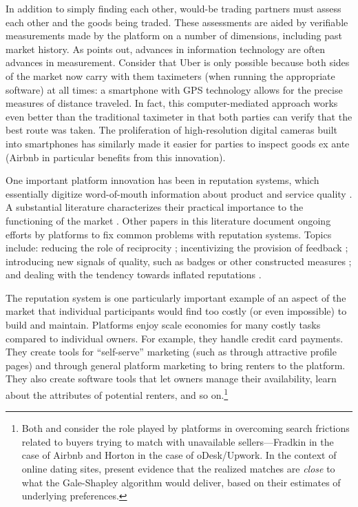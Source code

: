 \documentclass[11pt]{article}
\begin{document}
In addition to simply finding each other, would-be trading partners must assess each other and the goods being traded. 
These assessments are aided by verifiable measurements made by the platform on a number of dimensions, including past market history. 
As \cite{varian2010computer} points out, advances in information technology are often advances in measurement.  
Consider that Uber is only possible because both sides of the market now carry with them taximeters (when running the appropriate software) at all times: 
a smartphone with GPS technology allows for the precise measures of distance traveled.
In fact, this computer-mediated approach works even better than the traditional taximeter in that both parties can verify that the best route was taken. 
The proliferation of high-resolution digital cameras built into smartphones has similarly made it easier for parties to inspect goods ex ante (Airbnb in particular benefits from this innovation).  

One important platform innovation has been in reputation systems, which essentially digitize word-of-mouth information about product and service quality \cite{dellarocas2003digitization}. 
A substantial literature characterizes their practical importance to the functioning of the market \citep{cabral2010dynamics, resnick2000reputation, resnick2002trust}.
Other papers in this literature document ongoing efforts by platforms to fix common problems with reputation systems.
Topics include: reducing the role of reciprocity \citep{bolton2013engineering};
incentivizing the provision of feedback \citep{fradkin2015bias}; 
introducing new signals of quality, such as badges or other constructed measures \citep{hui2014lemon, nosko2015limits}; 
and dealing with the tendency towards inflated reputations \citep{horton2015reputation}.  

The reputation system is one particularly important example of an aspect of the market that individual participants would find too costly (or even impossible) to build and maintain. 
Platforms enjoy scale economies for many costly tasks compared to individual owners. 
For example, they handle credit card payments. 
They create tools for ``self-serve'' marketing (such as through attractive profile pages) and through general platform marketing to bring renters to the platform. 
They also create software tools that let owners manage their availability, learn about the attributes of potential renters, and so on.\footnote{
  Both \cite{horton2014misdirected} and \cite{fradkin2013search} consider the role played by platforms in overcoming search frictions related to buyers trying to match with unavailable sellers---Fradkin in the case of Airbnb and Horton in the case of oDesk/Upwork.
  In the context of online dating sites, \cite{hitsch2010matching} present evidence that the realized matches are \emph{close} to what the Gale-Shapley algorithm would deliver, based on their estimates of underlying preferences.
}
\end{document}
